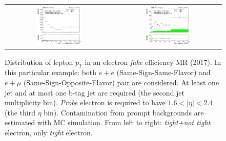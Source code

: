\begin{figure}[tbh!]
 \begin{center}
 \begin{tabular}{cc}
 \includegraphics[width=0.45\textwidth]{figures/Part3/Nonprompt/MR/FlepPt}&
 \includegraphics[width=0.45\textwidth]{figures/Part3/Nonprompt/MR/TlepPt} \\
 \end{tabular}
 \caption{Distribution of lepton $p_{T}$ in an electron \emph{fake} efficiency MR (2017). In this particular example: both $e+e$ (Same-Sign-Same-Flavor) and $e+\mu$ (Same-Sign-Opposite-Flavor) pair are considered. At least one jet and at most one b-tag jet are required (the second jet multiplicity bin). \emph{Probe} electron is required to have $1.6<|\eta|<2.4$ (the third $\eta$ bin). Contamination from prompt backgrounds are estimated with MC simulation. From left to right: \emph{tight+not tight} electron, only \emph{tight} electron.}
 \label{fig:MRexample}
 \end{center}
\end{figure}

